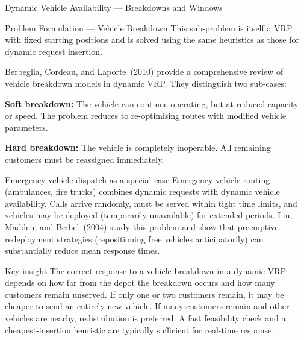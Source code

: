 \documentclass[aspectratio=169,10pt]{beamer}
\begin{document}
\begin{frame}[allowframebreaks]{Dynamic Vehicle Availability — Breakdowns and Windows}
\begin{block}{Problem Formulation — Vehicle Breakdown}
    This sub-problem is itself a VRP with fixed starting positions and is
    solved using the same heuristics as those for dynamic request insertion.
  \end{block}

  \framebreak

  Berbeglia, Cordeau, and Laporte~(2010) provide a comprehensive review of
  vehicle breakdown models in dynamic VRP.  They distinguish two sub-cases:

  \medskip
  \textbf{Soft breakdown:} The vehicle can continue operating, but at reduced
  capacity or speed.  The problem reduces to re-optimising routes with
  modified vehicle parameters.

  \medskip
  \textbf{Hard breakdown:} The vehicle is completely inoperable.  All remaining
  customers must be reassigned immediately.

  \begin{block}{Emergency vehicle dispatch as a special case}
    Emergency vehicle routing (ambulances, fire trucks) combines dynamic
    requests with dynamic vehicle availability.  Calls arrive randomly,
    must be served within tight time limits, and vehicles may be deployed
    (temporarily unavailable) for extended periods.  Liu, Madden, and
    Beibel~(2004) study this problem and show that preemptive redeployment
    strategies (repositioning free vehicles anticipatorily) can substantially
    reduce mean response times.
  \end{block}

  \begin{alertblock}{Key insight}
    The correct response to a vehicle breakdown in a dynamic VRP depends on
    how far from the depot the breakdown occurs and how many customers remain
    unserved.  If only one or two customers remain, it may be cheaper to send
    an entirely new vehicle.  If many customers remain and other vehicles are
    nearby, redistribution is preferred.  A fast feasibility check and a
    cheapest-insertion heuristic are typically sufficient for real-time response.
  \end{alertblock}

\end{frame}
\end{document}

